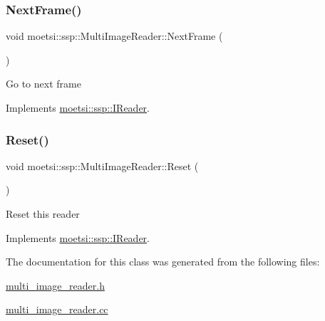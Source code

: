 \subsubsection{\texorpdfstring{Next\+Frame()}{NextFrame()}}
{\footnotesize\ttfamily void moetsi\+::ssp\+::\+Multi\+Image\+Reader\+::\+Next\+Frame (\begin{DoxyParamCaption}{ }\end{DoxyParamCaption})\hspace{0.3cm}{\ttfamily [virtual]}}

Go to next frame 

Implements \hyperlink{classmoetsi_1_1ssp_1_1IReader_a49e82a786cca55248e27e7fac8f97a17}{moetsi\+::ssp\+::\+I\+Reader}.

\mbox{\label{classmoetsi_1_1ssp_1_1MultiImageReader_a3a60b57e1db97cb170435dd7f0d4c66d}} 
\subsubsection{\texorpdfstring{Reset()}{Reset()}}
{\footnotesize\ttfamily void moetsi\+::ssp\+::\+Multi\+Image\+Reader\+::\+Reset (\begin{DoxyParamCaption}{ }\end{DoxyParamCaption})\hspace{0.3cm}{\ttfamily [virtual]}}

Reset this reader 

Implements \hyperlink{classmoetsi_1_1ssp_1_1IReader_ad6e2ef78fc2466884aa877ecef54889d}{moetsi\+::ssp\+::\+I\+Reader}.



The documentation for this class was generated from the following files\+:\begin{DoxyCompactItemize}
\item 
\hyperlink{multi__image__reader_8h}{multi\+\_\+image\+\_\+reader.\+h}\item 
\hyperlink{multi__image__reader_8cc}{multi\+\_\+image\+\_\+reader.\+cc}\end{DoxyCompactItemize}
